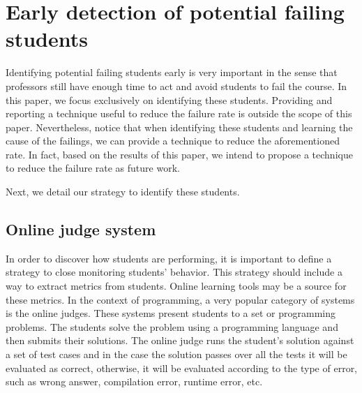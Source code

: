 \section{Early detection of potential failing students}

\label{sec:strategy}

Identifying potential failing students early is very important in the sense that professors still have enough time to act and avoid students to fail the course. In this paper, we focus exclusively on identifying these students. Providing and reporting a technique useful to reduce the failure rate is outside the scope of this paper. Nevertheless, notice that when identifying these students and learning the cause of the failings, we can provide a technique to reduce the aforementioned rate. In fact, based on the results of this paper, we intend to propose a technique to reduce the failure rate as future work.

Next, we detail our strategy to identify these students.

\subsection{Online judge system}
In order to discover how students are performing, it is important to define a strategy to close monitoring students’ behavior. This strategy should include a way to extract metrics from students. Online learning tools may be a source for these metrics. In the context of programming, a very popular category of systems is the online judges. These systems present students to a set or programming problems. The students solve the problem using a programming language and then submits their solutions. The online judge runs the student’s solution against a set of test cases and in the case the solution passes over all the tests it will be evaluated as correct, otherwise, it will be evaluated according to the type of error, such as wrong answer, compilation error, runtime error, etc.

